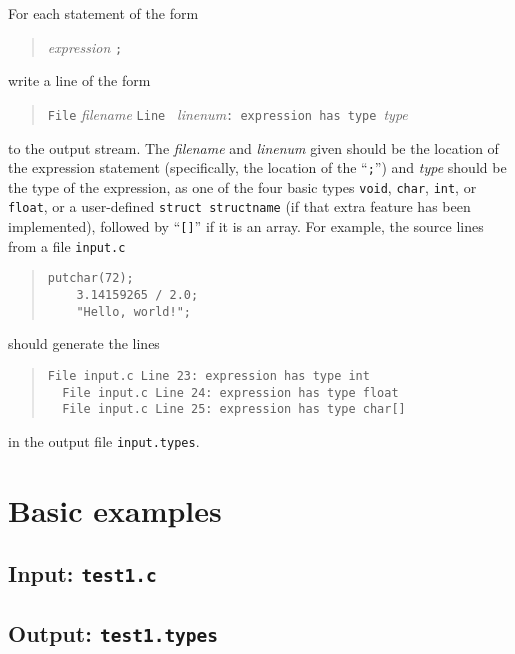 \documentclass{article}
\begin{document}
For each statement of the form
\begin{quote}
  \emph{expression} {\tt ;}
\end{quote}
write a line of the form
\begin{quote}
  {\tt File} \emph{filename} {\tt Line } \emph{linenum}{\tt : expression has type}~\emph{type}
\end{quote}
to the output stream.
The \emph{filename} and \emph{linenum} given
should be the location of the expression statement
(specifically, the location of the ``\verb|;|'')
and \emph{type} should be the type of the expression,
as one of the four basic types
{\tt void}, {\tt char}, {\tt int}, or {\tt float},
or a user-defined {\tt struct structname}
(if that extra feature has been implemented),
followed by ``\verb|[]|'' if it is an array.
For example, the source lines from a file {\tt input.c}
\begin{quote}
\begin{lstlisting}[firstnumber=23]
    putchar(72);
    3.14159265 / 2.0;
    "Hello, world!";
\end{lstlisting}
\end{quote}
should generate the lines
\begin{quote}
  \begin{lstlisting}[style=Output]
  File input.c Line 23: expression has type int
  File input.c Line 24: expression has type float
  File input.c Line 25: expression has type char[]
  \end{lstlisting}
\end{quote}
in the output file {\tt input.types}.




\section{Basic examples} \label{SEC:exmin}

\subsection{Input: {\tt test1.c}}



\subsection{Output: {\tt test1.types}}
\end{document}
